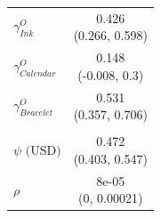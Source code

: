\begin{tabular}[t]{lc}
\hspace{1em}\(\gamma^O_{Ink}\) & \makecell[c]{0.426\\(0.266, 0.598)}\\
\hspace{1em}\(\gamma^O_{Calendar}\) & \makecell[c]{0.148\\(-0.008, 0.3)}\\
\hspace{1em}\(\gamma^O_{Bracelet}\) & \makecell[c]{0.531\\(0.357, 0.706)}\\
\addlinespace[0.3em]
\multicolumn{2}{l}{\textbf{Relative valuation}}\\
\hspace{1em}\(\psi\text{ (USD)}\) & \makecell[c]{0.472\\(0.403, 0.547)}\\
\hspace{1em}\(\rho\) & \makecell[c]{8e-05\\(0, 0.00021)}\\
\bottomrule
\end{tabular}
